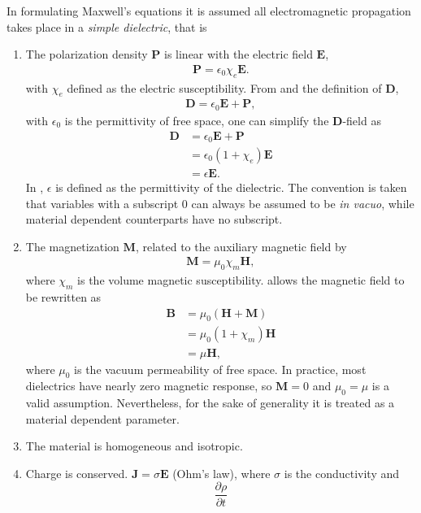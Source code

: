 In formulating Maxwell's equations it is assumed all electromagnetic
propagation takes place in a {\it simple dielectric}, that is
\begin{enumerate}
\item The polarization density $\mathbf{P}$ is linear with the electric
field $\mathbf{E}$,
\begin{align}
\mathbf{P}=\epsilon_0\chi_e\mathbf{E}.
\label{eqn:pdensity}
\end{align}
with $\chi_e$ defined as the electric susceptibility.  From
 and the definition
of $\mathbf{D}$,
\begin{align}
\mathbf{D}=\epsilon_0\mathbf{E}+\mathbf{P},
\label{eqn:dfield}
\end{align}
with $\epsilon_0$ is the permittivity of free space, one can simplify the
$\mathbf{D}$-field as
\begin{align}
\mathbf{D}&=\epsilon_0\mathbf{E}+\mathbf{P}\\
&=\epsilon_0(1+\chi_e)\mathbf{E}\\
&=\epsilon\mathbf{E}.
\label{eqn:permittivitydangle}
\end{align}
In , $\epsilon$ is defined as the
permittivity of the dielectric.  The convention is taken
that variables with a subscript $0$ can always be assumed to be
{\it in vacuo}, while material dependent counterparts have
no subscript.
\item The magnetization $\mathbf{M}$, related to the
auxiliary magnetic field by
\begin{align}
\mathbf{M}=\mu_0\chi_m\mathbf{H},
\label{eqn:auxfield}
\end{align}
where $\chi_m$ is the volume magnetic susceptibility.
 allows the
magnetic field to be rewritten as
\begin{align}
\mathbf{B}&=\mu_0\left(\mathbf{H}+\mathbf{M}\right)\\
&=\mu_0\left(1+\chi_m\right)\mathbf{H}\\
&=\mu \mathbf{H},
\end{align}
where $\mu_0$ is the vacuum permeability of free space.  In practice, most
dielectrics have nearly zero magnetic response, so $\mathbf{M}=0$ and
$\mu_0=\mu$ is a valid assumption.  Nevertheless, for the sake of generality it is treated as a
material dependent parameter.
\item The material is homogeneous and isotropic.
\item Charge is conserved.  $\mathbf{J} = \sigma \mathbf{E}$ (Ohm's law), where
 $\sigma$ is the conductivity and
\begin{equation}
 \frac{\partial \rho}{\partial t}
\end{equation}
\end{enumerate}
